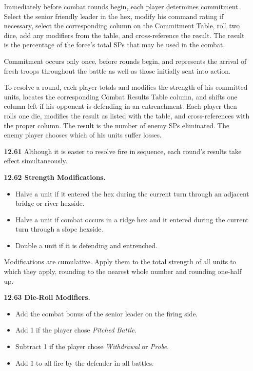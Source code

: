 
Immediately before combat rounds begin, each player determines commitment. Select the senior friendly leader in the hex, modify his command rating if necessary, select the corresponding column on the Commitment Table, roll two dice, add any modifiers from the table, and cross-reference the result. The result is the percentage of the force's total SPs that may be used in the combat.

Commitment occurs only once, before rounds begin, and represents the arrival of fresh troops throughout the battle as well as those initially sent into action.


To resolve a round, each player totals and modifies the strength of his committed units, locates the corresponding Combat Results Table column, and shifts one column left if his opponent is defending in an entrenchment. Each player then rolls one die, modifies the result as listed with the table, and cross-references with the proper column. The result is the number of enemy SPs eliminated. The enemy player chooses which of his units suffer losses.

\textbf{12.61} Although it is easier to resolve fire in sequence, each round's results take effect simultaneously.

\textbf{12.62 Strength Modifications.}
\begin{itemize}
\item Halve a unit if it entered the hex during the current turn through an adjacent bridge or river hexside.
\item Halve a unit if combat occurs in a ridge hex and it entered during the current turn through a slope hexside.
\item Double a unit if it is defending and entrenched.
\end{itemize}

Modifications are cumulative. Apply them to the total strength of all units to which they apply, rounding to the nearest whole number and rounding one-half up.

\textbf{12.63 Die-Roll Modifiers.}
\begin{itemize}
\item Add the combat bonus of the senior leader on the firing side.
\item Add 1 if the player chose \textit{Pitched Battle}.
\item Subtract 1 if the player chose \textit{Withdrawal} or \textit{Probe}.
\item Add 1 to all fire by the defender in all battles.
\end{itemize}

